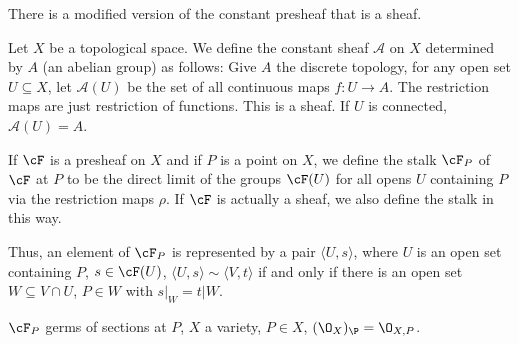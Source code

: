 There is a modified version of the constant presheaf that is a sheaf. 

Let $X$ be a topological space. We define the constant sheaf $\mathcal{A}$ on $X$ determined by $A$ (an abelian group) as follows: Give $A$ the discrete topology, for any open set $U \subseteq X$, let $\mathcal{A}(U)$ be the set of all continuous maps $f: U \to A$. The restriction maps are just restriction of functions. This is a sheaf. If $U$ is connected, $\mathcal{A}(U)= A$.


\begin{dfn}
If $\cF$ is a presheaf on $X$ and if $P$ is a point on $X$, we define the stalk $\cF_P$ of $\cF$ at $P$ to be the direct limit of the groups $\cF(U)$ for all opens $U$ containing $P$ via the restriction maps $\rho$. If $\cF$ is actually a sheaf, we also define the stalk in this way.
\end{dfn}


Thus, an element of $\cF_P$ is represented by a pair $\langle U,s \rangle$, where $U$ is an open set containing $P$, $s \in \cF(U)$, $\langle U,s \rangle \sim \langle V, t \rangle$ if and only if there is an open set $W \subseteq V \cap U$, $P \in W$ with $s\big|_W= t\big|W$. 

$\cF_P$ germs of sections at $P$, $X$ a variety, $P \in X$, $(\O_X)_\P= \O_{X,P}$. 





























































